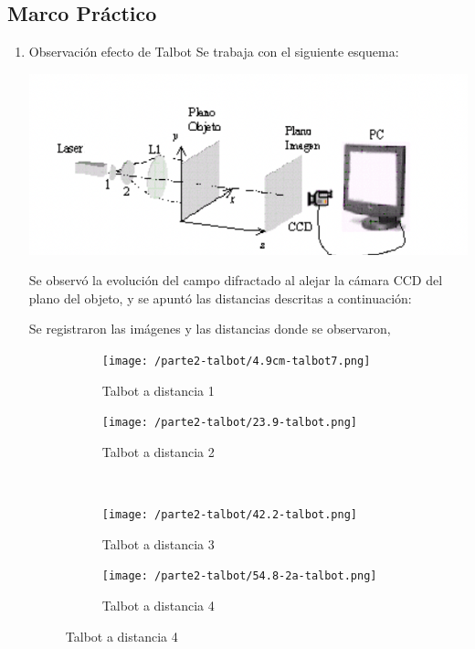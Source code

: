 \documentclass{./packages/optica-article}
\begin{document}
\subsection{Marco Práctico}
    \begin{enumerate}
    \item Observación efecto de Talbot
Se trabaja con el siguiente esquema:

\begin{center}
    \includegraphics[scale=1]{sistematalbot.png}
    \label{fig:talbot} %
\end{center}
    
    
Se observó la evolución del campo difractado al alejar la cámara CCD del plano del objeto, y se apuntó las distancias descritas a continuación:


Se registraron las imágenes y las distancias donde se observaron, 

\begin{figure}[hptb]
\begin{center}
    \begin{subfigure}[t]{0.45\textwidth}\centering
        \texttt{[image: /parte2-talbot/4.9cm-talbot7.png]}
        \caption{ Talbot a distancia 1}
        \label{fig:talbot1}	
    \end{subfigure}
	\hfill
	\begin{subfigure}[t]{0.45\textwidth}\centering
		\texttt{[image: /parte2-talbot/23.9-talbot.png]}
        \caption{Talbot a distancia 2}
        \label{fig:talbot2}
	\end{subfigure}
	\\
	\begin{subfigure}[t]{0.45\textwidth}\centering
		\texttt{[image: /parte2-talbot/42.2-talbot.png]}
        \caption{ Talbot a distancia 3}
        \label{fig:talbot3}
	\end{subfigure}
	\hfill
	\begin{subfigure}[t]{0.45\textwidth}\centering
		\texttt{[image: /parte2-talbot/54.8-2a-talbot.png]}
        \caption{ Talbot a distancia 4}
        \label{fig:talbot4}
	\end{subfigure}
	

\end{center}
\end{figure}
\end{enumerate}
\end{document}
